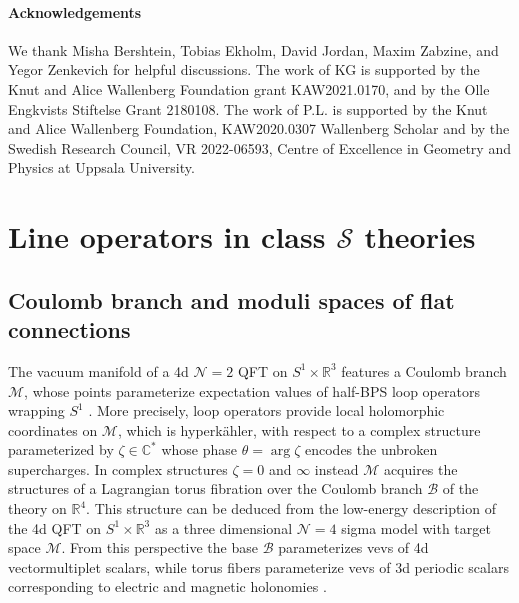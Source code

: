\documentclass{article}
\numberwithin{equation}{section}
\newcommand{\IC}{\mathbb{C}}
\newcommand{\IR}{\mathbb{R}}
\newcommand{\CS}{\mathcal{S}}
\def\IR{{\mathbb{R}}}
\def\IC{{\mathbb{C}}}
\def\CB{{\mathcal{B}}}
\def\CM{{\mathcal{M}}}
\def\CN{{\mathcal{N}}}
\begin{document}
%
%

\paragraph{Acknowledgements}
We thank Misha Bershtein, Tobias Ekholm, David Jordan, Maxim Zabzine, and Yegor Zenkevich for helpful discussions.
The work of KG is supported by the Knut and Alice Wallenberg Foundation grant
KAW2021.0170, and by the Olle Engkvists Stiftelse Grant 2180108.
The work of P.L. is supported by the Knut and Alice Wallenberg Foundation,
KAW2020.0307 Wallenberg Scholar and by the Swedish Research Council, VR 2022-06593, Centre of Excellence in Geometry and Physics at Uppsala University.



\section{Line operators in class $\CS$ theories}\label{sec:}


\subsection{Coulomb branch and moduli spaces of flat connections
}\label{sec:}

The vacuum manifold of a 4d $\CN=2$ QFT on $S^1\times \IR^3$ features a Coulomb branch $\CM$, whose points parameterize expectation values of half-BPS loop operators wrapping $S^1$ \cite{Seiberg:1996nz, Gaiotto:2010be}.
More precisely, loop operators provide local holomorphic coordinates on $\CM$, which is hyperk\"ahler, with respect to a complex structure parameterized by $\zeta\in \IC^*$ whose phase $\theta = \arg \zeta$ encodes the unbroken supercharges.
In complex structures $\zeta=0$ and $\infty$ instead $\CM$ acquires the structures of a Lagrangian torus fibration over the Coulomb branch $\CB$ of the theory on $\mathbb{R}^4$. 
This structure can be deduced from the low-energy description of the 4d QFT on $S^1\times \IR^3$ as a three dimensional $\CN=4$ sigma model with target space $\CM$. From this perspective the base $\CB$ parameterizes vevs of 4d vectormultiplet scalars, while torus fibers parameterize vevs of 3d periodic scalars corresponding to electric and magnetic holonomies \cite{Gaiotto:2010okc}.
\end{document}
